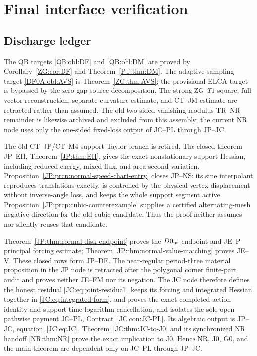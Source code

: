\documentclass[11pt]{amsart}
\numberwithin{equation}{section}
\theoremstyle{definition}
\theoremstyle{remark}
\begin{document}
\section{Final interface verification}
\label{sec:final-interface-verification}

\subsection{Discharge ledger}

The QB targets \ref{QB:obl:DF} and \ref{QB:obl:DM} are proved by
Corollary~\ref{ZG:cor:DF} and Theorem~\ref{PT:thm:DM}.  The adaptive
sampling target \ref{DF0A:obl:AVS} is Theorem~\ref{ZG:thm:AVS}; the
provisional ELCA target is bypassed by the zero-gap source decomposition.
The strong ZG--$T1$ square, full-vector reconstruction, separate-curvature
estimate, and CT--JM estimate are retracted rather than assumed.
The old two-sided vanishing-modulus TR--NR remainder is likewise archived
and excluded from this assembly; the current NR node uses only the
one-sided fixed-loss output of JC--PL through JP--JC.

The old CT--JP/CT--M4 support Taylor branch is retired.  The closed theorem
JP--EH, Theorem~\ref{JP:thm:EH}, gives the exact nonstationary support
Hessian, including reduced energy, mixed flux, and area second variation.
Proposition~\ref{JP:prop:normal-speed-chart-entry} closes JP--NS: its sine
interpolant reproduces translations exactly, is controlled by the physical
vertex displacement without inverse-angle loss, and keeps the whole
support segment active.
Proposition~\ref{JP:prop:cubic-counterexample} supplies a certified
alternating-mesh negative direction for the old cubic candidate.  Thus the
proof neither assumes nor silently reuses that candidate.

Theorem~\ref{JP:thm:normal-disk-endpoint} proves the $D0_{\rm ns}$ endpoint
and JE--P principal forcing estimate; Theorem
\ref{JP:thm:normal-value-matching} proves JE--V.  These closed rows form
JP--DE.  The near-regular period-three material proposition in the JP node
is retracted after the polygonal corner finite-part audit and proves
neither JE--FM nor its negation.  The JC node
therefore defines the honest residual \ref{JC:eq:joint-residual}, keeps its
forcing and integrated Hessian together in \ref{JC:eq:integrated-form}, and
proves the exact completed-action identity and support-time logarithm
cancellation, and isolates the sole open pathwise payment JC--PL,
Contract~\ref{JC:con:JC-PL}.  Its algebraic output is JP--JC,
equation~\ref{JC:eq:JC}.
Theorem~\ref{JC:thm:JC-to-J0} and its synchronized NR handoff
\ref{NR:thm:NR} prove the exact implication to J0.  Hence NR, J0, G0, and
the main theorem are dependent only on JC--PL through JP--JC.
\end{document}
